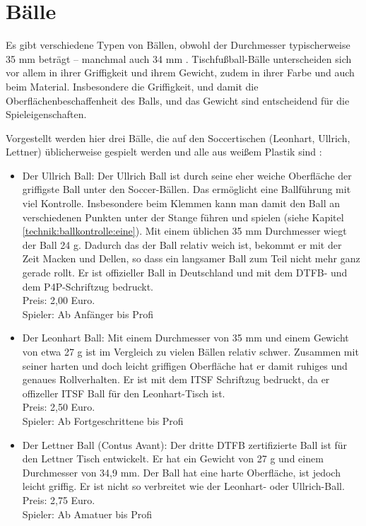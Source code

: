 \section{Bälle}
\label{tisch:baelle}

Es gibt verschiedene Typen von Bällen, obwohl der Durchmesser typischerweise 35 mm beträgt -- manchmal auch 34 mm \citep{www:kickerbau:baelle}.
Tischfußball-Bälle unterscheiden sich vor allem in ihrer Griffigkeit und ihrem Gewicht, zudem in ihrer Farbe und auch beim Material.
Insbesondere die Griffigkeit, und damit die Oberflächenbeschaffenheit des Balls, und das Gewicht sind entscheidend für die Spieleigenschaften.  

Vorgestellt werden hier drei Bälle, die auf den Soccertischen (Leonhart, Ullrich, Lettner) üblicherweise gespielt werden und alle aus weißem Plastik sind \citep{www:tfc-reutlingen}:
\begin{itemize}
\item Der Ullrich Ball:
Der Ullrich Ball ist durch seine eher weiche Oberfläche der griffigste Ball unter den Soccer-Bällen. 
Das ermöglicht eine Ballführung mit viel Kontrolle. Insbesondere beim Klemmen kann man damit den Ball an verschiedenen Punkten unter der Stange führen und spielen (siehe Kapitel \ref{technik:ballkontrolle:eine}).
Mit einem üblichen 35 mm Durchmesser wiegt der Ball 24 g.
Dadurch das der Ball relativ weich ist, bekommt er mit der Zeit Macken und Dellen, so dass ein langsamer Ball zum Teil nicht mehr ganz gerade rollt.
Er ist offizieller Ball in Deutschland und mit dem DTFB- und dem P4P-Schriftzug bedruckt.
\\
Preis: 2,00 Euro. 
\\
Spieler: Ab Anfänger bis Profi
\item Der Leonhart Ball: 
Mit einem Durchmesser von 35 mm und einem Gewicht von etwa 27 g ist im Vergleich zu vielen Bällen relativ schwer. 
Zusammen mit seiner harten und doch leicht griffigen Oberfläche hat er damit ruhiges und genaues Rollverhalten.
Er ist mit dem ITSF Schriftzug bedruckt, da er offizeller ITSF Ball für den Leonhart-Tisch ist.
\\
Preis: 2,50 Euro. 
\\
Spieler: Ab Fortgeschrittene bis Profi
\item Der Lettner Ball (Contus Avant):
Der dritte DTFB zertifizierte Ball ist für den Lettner Tisch entwickelt.
Er hat ein Gewicht von 27 g und einem Durchmesser von 34,9 mm.
Der Ball hat eine harte Oberfläche, ist jedoch leicht griffig. 
Er ist nicht so verbreitet wie der Leonhart- oder Ullrich-Ball. 
\\
Preis: 2,75 Euro.
\\
Spieler: Ab Amatuer bis Profi
\end{itemize}

